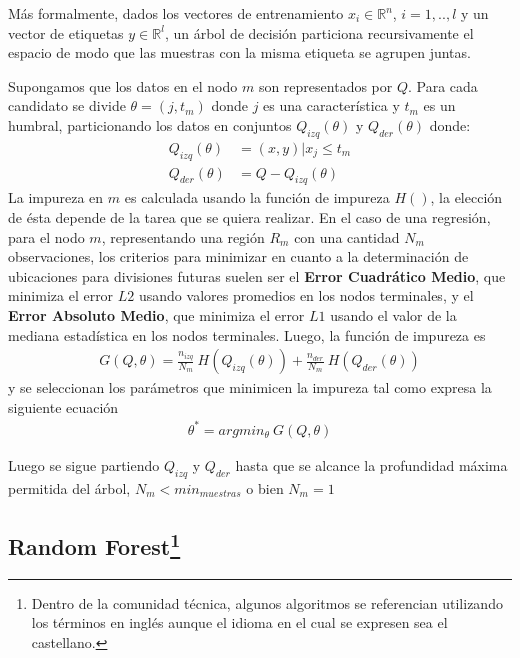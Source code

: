     \par Más formalmente, dados los vectores de entrenamiento $x_{i} \in \mathbb{R}^{n}$, $i = 1,..,l$
      y un vector de etiquetas $y \in \mathbb{R}^{l}$, un árbol de decisión particiona
      recursivamente el espacio de modo que las muestras con la misma etiqueta se agrupen juntas.


    \par Supongamos que los datos en el nodo $m$ son representados por $Q$. Para cada
      candidato se divide $\theta = (j, t_{m})$ donde $j$ es una característica y
      $t_{m}$ es un humbral, particionando los datos en conjuntos $Q_{izq}(\theta)$ y
      $Q_{der}(\theta)$ donde:
      \begin{align}
        Q_{izq}(\theta) &= (x, y) | x_{j} \leq t_m \\
        Q_{der}(\theta) &= Q - Q_{izq}(\theta)
      \end{align}
      La impureza en $m$ es calculada usando la función de impureza $H()$, la elección
      de ésta depende de la tarea que se quiera realizar.
      En el caso de una regresión, para el nodo $m$, representando una
      región $R_{m}$ con una cantidad $N_{m}$ observaciones, los criterios
      para minimizar en cuanto a la determinación de ubicaciones para divisiones
      futuras suelen ser el \textbf{Error Cuadrático Medio}, que minimiza el error $L2$ usando
      valores promedios en los nodos terminales, y el \textbf{Error Absoluto Medio}, que minimiza
      el error $L1$ usando el valor de la mediana estadística en los nodos terminales.
      Luego, la función de impureza es
      \begin{align}
        G(Q, \theta) = \frac{n_{izq}}{N_{m}} \ H(Q_{izq}(\theta)) + \frac{n_{der}}{N_{m}} \ H(Q_{der}(\theta))
      \end{align}
      y se seleccionan los parámetros que minimicen la impureza tal como expresa la
      siguiente ecuación
      \begin{align}
        \theta^{*} = argmin_{\theta} \ G(Q, \theta)
      \end{align}

      Luego se sigue partiendo $Q_{izq}$ y $Q_{der}$ hasta que se alcance la profundidad
      máxima permitida del árbol, $N_{m} < min_{muestras}$ o bien $N_{m} = 1$


  \subsection[Random Forest]{Random Forest\footnote{Dentro de la comunidad técnica, algunos
  algoritmos se referencian utilizando los términos en inglés
  aunque el idioma en el cual se expresen sea el castellano.}}


